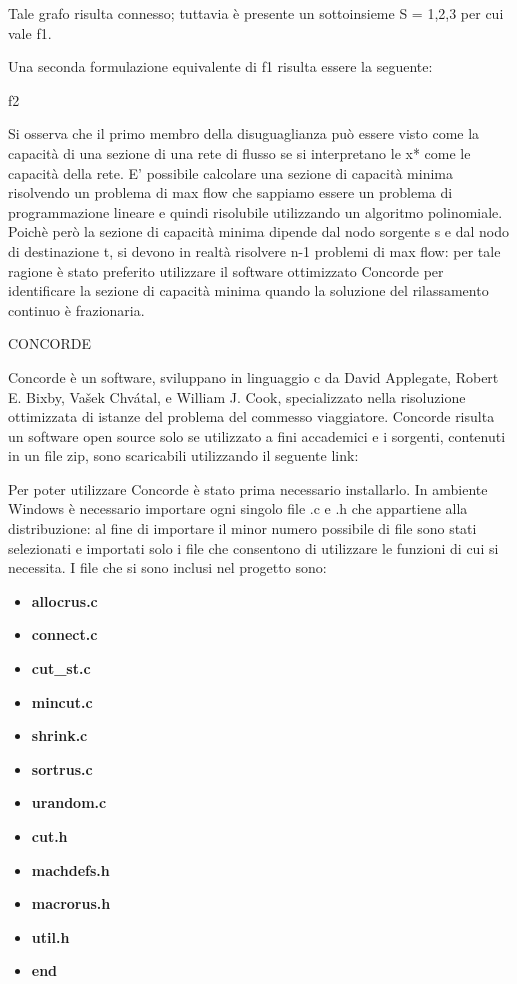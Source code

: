 \documentclass[11pt]{article}
\begin{document}
Tale grafo risulta connesso; tuttavia è presente un sottoinsieme S = {1,2,3} per cui vale f1.

Una seconda formulazione equivalente di f1 risulta essere la seguente:

f2

Si osserva che il primo membro della disuguaglianza può essere visto come la capacità di una sezione di una rete di flusso se si interpretano le x* come le capacità della rete.
E' possibile calcolare una sezione di capacità minima risolvendo un problema di max flow che sappiamo essere un problema di programmazione lineare e quindi risolubile utilizzando un algoritmo polinomiale.
Poichè però la sezione di capacità minima dipende dal nodo sorgente s e dal nodo di destinazione t, si devono in realtà risolvere n-1 problemi di max flow: per tale ragione è stato preferito utilizzare il software ottimizzato Concorde per identificare la sezione di capacità minima quando la soluzione del rilassamento continuo è frazionaria. 

\vspace{2\baselineskip}
CONCORDE
\vspace{2\baselineskip}

Concorde è un software, sviluppano in linguaggio c da David Applegate, Robert E. Bixby, Vašek Chvátal, e William J. Cook, specializzato nella risoluzione ottimizzata di istanze del problema del commesso viaggiatore. Concorde risulta un software open source solo se utilizzato a fini accademici e i sorgenti, contenuti in un file zip, sono scaricabili utilizzando il seguente link:




Per poter utilizzare Concorde è stato prima necessario installarlo. In ambiente Windows è necessario importare ogni singolo file .c e .h che appartiene alla distribuzione: al fine di importare il minor numero possibile di file sono stati selezionati e importati solo i file che consentono di utilizzare le funzioni di cui si necessita. I file che si sono inclusi nel progetto sono:


\begin{itemize}
	\item \textbf{allocrus.c}
	\item \textbf{connect.c}
	\item \textbf{cut_st.c}
	\item \textbf{mincut.c}
	\item \textbf{shrink.c}
	\item \textbf{sortrus.c}
	\item \textbf{urandom.c}
	\item \textbf{cut.h}
	\item \textbf{machdefs.h}
	\item \textbf{macrorus.h}
	\item \textbf{util.h}
	\item \textbf{end}
\end{itemize}
\end{document}
